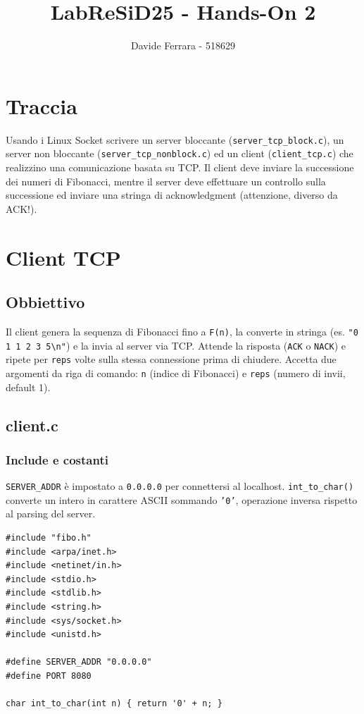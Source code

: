 \documentclass[a4paper,12pt]{article}
\title{LabReSiD25 - Hands-On 2}
\author{Davide Ferrara - 518629}
\date{}
\begin{document}
\maketitle

\section*{Traccia}
Usando i Linux Socket scrivere un server bloccante (\texttt{server\_tcp\_block.c}),
un server non bloccante (\texttt{server\_tcp\_nonblock.c}) ed un client (\texttt{client\_tcp.c})
che realizzino una comunicazione basata su TCP.
Il client deve inviare la successione dei numeri di Fibonacci, mentre il server
deve effettuare un controllo sulla successione ed inviare una stringa di
acknowledgment (attenzione, diverso da ACK!).

\section{Client TCP}

\subsection{Obbiettivo}
Il client genera la sequenza di Fibonacci fino a \texttt{F(n)}, la converte in
stringa (es. \texttt{"0 1 1 2 3 5\textbackslash n"}) e la invia al server via TCP.
Attende la risposta (\texttt{ACK} o \texttt{NACK}) e ripete per \texttt{reps}
volte sulla stessa connessione prima di chiudere.
\newline
Accetta due argomenti da riga di comando: \texttt{n} (indice di Fibonacci) e
\texttt{reps} (numero di invii, default 1).

\subsection{client.c}

\subsubsection{Include e costanti}
\texttt{SERVER\_ADDR} è impostato a \texttt{0.0.0.0} per connettersi al
localhost. \texttt{int\_to\_char()} converte un intero in carattere ASCII
sommando \texttt{'0'}, operazione inversa rispetto al parsing del server.

\begin{lstlisting}[caption={client.c - Include e costanti}]
#include "fibo.h"
#include <arpa/inet.h>
#include <netinet/in.h>
#include <stdio.h>
#include <stdlib.h>
#include <string.h>
#include <sys/socket.h>
#include <unistd.h>

#define SERVER_ADDR "0.0.0.0"
#define PORT 8080

char int_to_char(int n) { return '0' + n; }
\end{lstlisting}
\FloatBarrier
\end{document}
